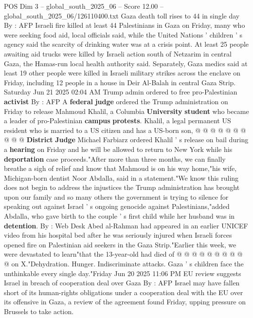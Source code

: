 \begin{textsample}{POS Dim 3 – global\_south\_2025\_06 – Score 12.00 – global\_south\_2025\_06/126110400.txt}  \label{ex:f3_pos_208}
Gaza death toll rises to 44 in single day By : AFP Israeli fire killed at least 44 Palestinians in Gaza on Friday, many who were seeking food aid, local officials said, while the United Nations ' children ' s agency said the scarcity of drinking water was at a crisis point.
At least 25 people awaiting aid trucks were killed by Israeli action south of Netzarim in central Gaza, the Hamas-run local health authority said.
Separately, Gaza medics said at least 19 other people were killed in Israeli military strikes across the enclave on Friday, including 12 people in a house in Deir Al-Balah in central Gaza Strip.
Saturday Jun 21 2025 02:04 AM Trump admin ordered to free pro-Palestinian \textbf{activist} By : AFP A \textbf{federal} \textbf{judge} ordered the Trump administration on Friday to release Mahmoud Khalil, a Columbia \textbf{University} \textbf{student} who became a leader of pro-Palestinian \textbf{campus} \textbf{protests}.
Khalil, a legal permanent US resident who is married to a US citizen and has a US-born son, @ @ @ @ @ @ @ @ @ @ \textbf{District} \textbf{Judge} Michael Farbiarz ordered Khalil ' s release on bail during a \textbf{hearing} on Friday and he will be allowed to return to New York while his \textbf{deportation} case proceeds."After more than three months, we can finally breathe a sigh of relief and know that Mahmoud is on his way home,"his wife, Michigan-born dentist Noor Abdalla, said in a statement."We know this ruling does not begin to address the injustices the Trump administration has brought upon our family and so many others the government is trying to silence for speaking out against Israel ' s ongoing genocide against Palestinians,"added Abdalla, who gave birth to the couple ' s first child while her husband was in \textbf{detention}.
By : Web Desk Abed al-Rahman had appeared in an earlier UNICEF video from his hospital bed after he was seriously injured when Israeli forces opened fire on Palestinian aid seekers in the Gaza Strip."Earlier this week, we were devastated to learn"that the 13-year-old had died of @ @ @ @ @ @ @ @ @ @ on X."Dehydration.
Hunger.
Indiscriminate attacks.
Gaza ' s children face the unthinkable every single day."Friday Jun 20 2025 11:06 PM EU review suggests Israel in breach of cooperation deal over Gaza By : AFP Israel may have fallen short of its human-rights obligations under a cooperation deal with the EU over its offensive in Gaza, a review of the agreement found Friday, upping pressure on Brussels to take action.

\end{textsample}
